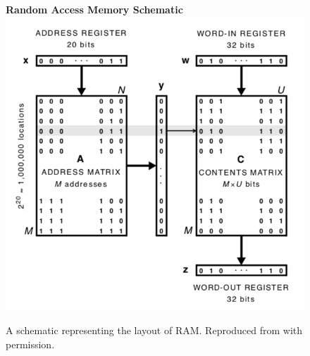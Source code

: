 \documentclass[journal, onecolumn, 12pt, draftclsnofoot]{IEEEtran}
\begin{document}
	\begin{figure}[ht]
		\begin{center}
			\textbf{Random Access Memory Schematic}
		\includegraphics[scale=0.5]{fig/RAM.png}
	\end{center}
		\caption{A schematic representing the layout of RAM. Reproduced from \cite{sdm} with permission.}
		\label{fig:RAM}
	\end{figure}
\end{document}
